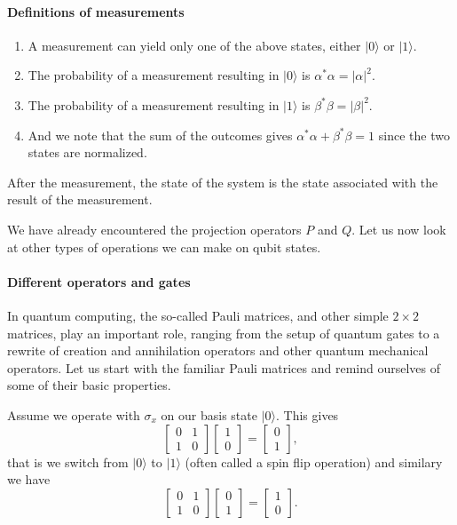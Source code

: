 \paragraph{Definitions of measurements}

\begin{enumerate}
\item A measurement can yield only one of the above states, either $\vert 0\rangle$ or $\vert 1\rangle$.

\item The probability of a measurement resulting in $\vert 0\rangle$ is $\alpha^*\alpha = \vert \alpha \vert^2$.

\item The probability of a measurement resulting in $\vert 1\rangle$ is $\beta^*\beta = \vert \beta \vert^2$.

\item And we note that the sum of the outcomes gives $\alpha^*\alpha+\beta^*\beta=1$ since the two states are normalized.
\end{enumerate}


After the measurement, the state of the system is the state associated with the result of the measurement.

We have already encountered the projection operators $P$ and $Q$. Let
us now look at other types of operations we can make on qubit states.


\paragraph{Different operators and gates}

In quantum computing, the so-called Pauli matrices, and other simple
$2\times 2$ matrices, play an important role, ranging from the setup
of quantum gates to a rewrite of creation and annihilation operators
and other quantum mechanical operators. Let us start with the familiar
Pauli matrices and remind ourselves of some of their basic properties.

Assume we operate with $\sigma_x$ on our basis state $\vert 0 \rangle$. This gives
\[
\begin{bmatrix} 0 & 1 \\ 1 & 0 \end{bmatrix}\begin{bmatrix} 1 \\ 0 \end{bmatrix}=\begin{bmatrix} 0  \\ 1  \end{bmatrix},
\]
that is we switch from $\vert 0\rangle$ to $\vert 1\rangle$ (often called a spin flip operation) and similary we have
\[
\begin{bmatrix} 0 & 1 \\ 1 & 0 \end{bmatrix}\begin{bmatrix} 0 \\ 1 \end{bmatrix}=\begin{bmatrix} 1  \\ 0  \end{bmatrix}.
\]


